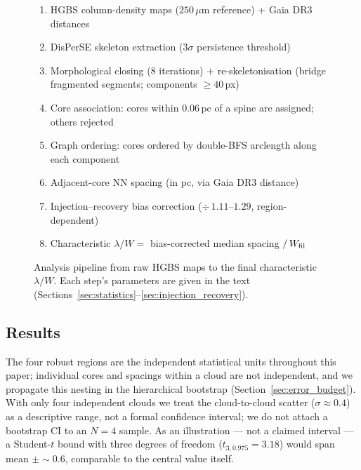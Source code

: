 \documentclass[usenatbib,twoside,twocolumn]{mnras}
\begin{document}
\begin{figure}
\centering
\begin{minipage}{0.95\columnwidth}
\footnotesize
\begin{enumerate}\setlength{\itemsep}{2pt}
\item HGBS column-density maps ($250\,\mu$m reference) + Gaia DR3 distances
\item DisPerSE skeleton extraction ($3\sigma$ persistence threshold)
\item Morphological closing (8 iterations) $+$ re-skeletonisation (bridge fragmented segments; components $\geq40$\,px)
\item Core association: cores within $0.06$\,pc of a spine are assigned; others rejected
\item Graph ordering: cores ordered by double-BFS arclength along each component
\item Adjacent-core NN spacing (in pc, via Gaia DR3 distance)
\item Injection--recovery bias correction ($\div\,1.11$--$1.29$, region-dependent)
\item Characteristic $\lambda/W = $ bias-corrected median spacing $/\,W_{\rm fil}$
\end{enumerate}
\end{minipage}
\caption{Analysis pipeline from raw HGBS maps to the final characteristic $\lambda/W$. Each step's parameters are given in the text (Sections~\ref{sec:statistics}--\ref{sec:injection_recovery}).}
\label{fig:pipeline}
\end{figure}

\subsection{Results}

The four robust regions are the independent statistical units throughout this paper; individual cores and spacings within a cloud are not independent, and we propagate this nesting in the hierarchical bootstrap (Section~\ref{sec:error_budget}). With only four independent clouds we treat the cloud-to-cloud scatter ($\sigma\approx0.4$) as a descriptive range, not a formal confidence interval; we do not attach a bootstrap CI to an $N=4$ sample. As an illustration --- not a claimed interval --- a Student-$t$ bound with three degrees of freedom ($t_{3,0.975}=3.18$) would span mean $\pm\sim0.6$, comparable to the central value itself.
\end{document}
